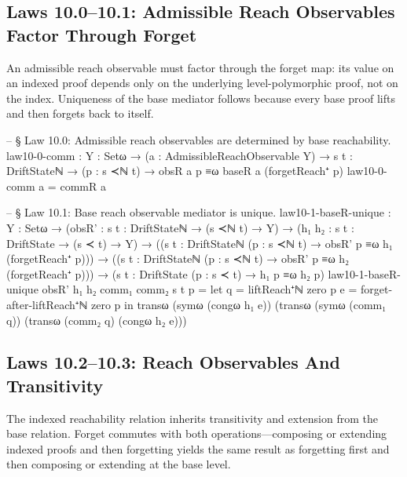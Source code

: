 \documentclass[11pt,a4paper]{book}
\begin{document}
\subsection{Laws 10.0--10.1: Admissible Reach Observables Factor Through Forget}

An admissible reach observable must factor through the forget map: its value on an indexed proof depends only on the underlying level-polymorphic proof, not on the index.
Uniqueness of the base mediator follows because every base proof lifts and then forgets back to itself.

\begin{code}
-- § Law 10.0: Admissible reach observables are determined by base reachability.
law10-0-comm : {Y : Setω} → (a : AdmissibleReachObservable Y) → {s t : DriftStateℕ} → (p : s ≺ℕ t) → obsR a p ≡ω baseR a (forgetReach⁺ p)
law10-0-comm a = commR a

-- § Law 10.1: Base reach observable mediator is unique.
law10-1-baseR-unique :
  {Y : Setω} →
  (obsR' : {s t : DriftStateℕ} → (s ≺ℕ t) → Y) →
  (h₁ h₂ : {s t : DriftState} → (s ≺ t) → Y) →
  (({s t : DriftStateℕ} (p : s ≺ℕ t) → obsR' p ≡ω h₁ (forgetReach⁺ p))) →
  (({s t : DriftStateℕ} (p : s ≺ℕ t) → obsR' p ≡ω h₂ (forgetReach⁺ p))) →
  ({s t : DriftState} (p : s ≺ t) → h₁ p ≡ω h₂ p)
law10-1-baseR-unique obsR' h₁ h₂ comm₁ comm₂ {s} {t} p =
  let
    q = liftReach⁺ℕ zero p
    e = forget-after-liftReach⁺ℕ zero p
  in
  transω
    (symω (congω h₁ e))
    (transω
      (symω (comm₁ q))
      (transω (comm₂ q) (congω h₂ e)))
\end{code}

\subsection{Laws 10.2--10.3: Reach Observables And Transitivity}

The indexed reachability relation inherits transitivity and extension from the base relation.
Forget commutes with both operations---composing or extending indexed proofs and then forgetting yields the same result as forgetting first and then composing or extending at the base level.
\end{document}
